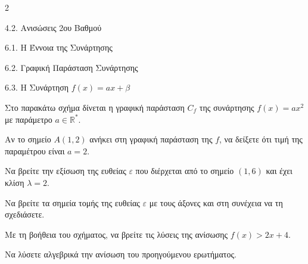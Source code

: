 \begin{ylh}{2}
    \item 4.2. Ανισώσεις 2ου Βαθμού
    \item 6.1. Η Έννοια της Συνάρτησης
    \item 6.2. Γραφική Παράσταση Συνάρτησης
    \item 6.3. Η Συνάρτηση $f(x)=ax+\beta$
\end{ylh}

Στο παρακάτω σχήμα δίνεται η γραφική παράσταση $C_f$ της συνάρτησης $f(x) = a x^2$ με παράμετρο $a \in \mathbb{R}^*$.
\begin{alist}
\item Αν το σημείο $A(1,2)$ ανήκει στη γραφική παράσταση της $f$, να δείξετε ότι τιμή της παραμέτρου είναι $a = 2$.
\item
  Να βρείτε την εξίσωση της ευθείας $\varepsilon$ που διέρχεται από το σημείο $(1,6)$ και έχει κλίση $\lambda = 2$.
\begin{center}
\end{center}
\item
  Να βρείτε τα σημεία τομής της ευθείας $\varepsilon$ με τους άξονες και στη συνέχεια να τη σχεδιάσετε.
\item
  Με τη βοήθεια του σχήματος, να βρείτε τις λύσεις της ανίσωσης $f(x) > 2x + 4$.
\item
  Να λύσετε αλγεβρικά την ανίσωση του προηγούμενου ερωτήματος.

\end{alist}

